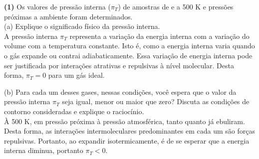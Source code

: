 \textbf{(1)} Os valores de pressão interna (\(\pi_T\)) de amostras de  e
 a 500 K e pressões próximas a ambiente foram determinados.\\

(a) Explique o significado físico da pressão interna.\\

   A pressão interna \( \pi_T \) representa a variação da energia interna com a
   variação do volume com a temperatura constante. Isto é, como a energia
   interna varia quando o gás expande ou contrai adiabaticamente. Essa variação
   de energia interna pode ser justificada por interações atrativas e repulsivas
   à nível molecular. Desta forma, \( \pi_T = 0 \) para um gás ideal. 

(b) Para cada um desses gases, nessas condições, você espera que o valor da
pressão interna \(\pi_T\)  seja igual, menor ou maior que zero? Discuta as
condições de contorno consideradas e explique o raciocínio.\\

    À 500 K, em pressão próxima à pressão atmosférica, tanto  quanto  já ebuliram. Desta forma, as
    interações intermoleculares predominantes em cada um são forças repulsivas.
    Portanto, ao expandir isotermicamente, é de se esperar que a energia interna
    diminua, portanto \( \pi_T < 0 \).
